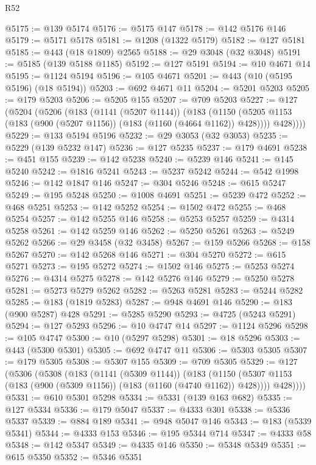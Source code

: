 \begin{lexlean}{R52}
\begin{coremodule}
@5175 := @139 @5174
@5176 := @5175 @147
@5178 := @142 @5176 @146
@5179 := @5171 @5178
@5181 := @1208 (@1322 @5179)
@5182 := @127 @5181
@5185 := @443 (@18 @1809) @2565
@5188 := @29 @3048 (@32 @3048)
@5191 := @5185 (@139 @5188 @1185)
@5192 := @127 @5191
@5194 := @10 @4671 @14
@5195 := @1124 @5194
@5196 := @105 @4671
@5201 := @443 (@10 (@5195 @5196) (@18 @5194))
@5203 := @692 @4671 @11
@5204 := @5201 @5203
@5205 := @179 @5203
@5206 := @5205 @155
@5207 := @709 @5203
@5227 := @127
    (@5204
      (@5206
        (@183
          (@1141 (@5207 @1144))
          (@183
            (@1150 (@5205 @1153 (@183 (@900 (@5207 @1156)) (@183 (@1160 (@4664 @1162)) @428))))
            @428))))
@5229 := @133 @5194 @5196
@5232 := @29 @3053 (@32 @3053)
@5235 := @5229 (@139 @5232 @147)
@5236 := @127 @5235
@5237 := @179 @4691
@5238 := @451 @155
@5239 := @142 @5238
@5240 := @5239 @146
@5241 := @145 @5240
@5242 := @1816 @5241
@5243 := @5237 @5242
@5244 := @542 @1998
@5246 := @142 @1847 @146
@5247 := @304 @5246
@5248 := @615 @5247
@5249 := @195 @5248
@5250 := @1008 @4691
@5251 := @5239 @472
@5252 := @468 @5251
@5253 := @142 @5252
@5254 := @1502 @472
@5255 := @468 @5254
@5257 := @142 @5255 @146
@5258 := @5253 @5257
@5259 := @4314 @5258
@5261 := @142 @5259 @146
@5262 := @5250 @5261
@5263 := @5249 @5262
@5266 := @29 @3458 (@32 @3458)
@5267 := @159 @5266
@5268 := @158 @5267
@5270 := @142 @5268 @146
@5271 := @304 @5270
@5272 := @615 @5271
@5273 := @195 @5272
@5274 := @1502 @146
@5275 := @5253 @5274
@5276 := @4314 @5275
@5278 := @142 @5276 @146
@5279 := @5250 @5278
@5281 := @5273 @5279 @5262
@5282 := @5263 @5281
@5283 := @5244 @5282
@5285 := @183 (@1819 @5283)
@5287 := @948 @4691 @146
@5290 := @183 (@900 @5287) @428
@5291 := @5285 @5290
@5293 := @4725 (@5243 @5291)
@5294 := @127 @5293
@5296 := @10 @4747 @14
@5297 := @1124 @5296
@5298 := @105 @4747
@5300 := @10 (@5297 @5298)
@5301 := @18 @5296
@5303 := @443 (@5300 @5301)
@5305 := @692 @4747 @11
@5306 := @5303 @5305
@5307 := @179 @5305
@5308 := @5307 @155
@5309 := @709 @5305
@5329 := @127
    (@5306
      (@5308
        (@183
          (@1141 (@5309 @1144))
          (@183
            (@1150 (@5307 @1153 (@183 (@900 (@5309 @1156)) (@183 (@1160 (@4740 @1162)) @428))))
            @428))))
@5331 := @610 @5301 @5298
@5334 := @5331 (@139 @163 @682)
@5335 := @127 @5334
@5336 := @179 @5047
@5337 := @4333 @301
@5338 := @5336 @5337
@5339 := @884 @189
@5341 := @948 @5047 @146
@5343 := @183 (@5339 @5341)
@5344 := @4333 @153
@5346 := @195 @5344 @714
@5347 := @4333 @58
@5348 := @142 @5347
@5349 := @4335 @146
@5350 := @5348 @5349
@5351 := @615 @5350
@5352 := @5346 @5351

\end{coremodule}
\end{lexlean}
